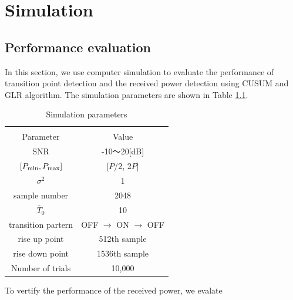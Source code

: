\chapter[Simulation]{Simulation}
\label{chapter:Result}



\section{Performance evaluation}
In this section, we use computer simulation to evaluate the performance of transition point detection and the received power detection using CUSUM and GLR algorithm. The simulation parameters are shown in Table \ref{parameter}.

\begin{table}[!htp]
\begin{center}
 \caption{\normalsize{Simulation parameters}}
 
\normalsize

  \begin{tabular}{c|c}
    & \\
    Parameter &Value \\ \hline
    SNR & -10〜20[dB] \\
    $[P_{{\rm min}},P_{{\rm max}}]$ & [$P$/2, 2$P$] \\
    $\sigma^2$ & 1 \\
    sample number & 2048 \\
    $\bar{T}_0$ & 10 \\
    transition partern & OFF $\rightarrow$ ON $\rightarrow$ OFF \\
    rise up point & 512th sample\\
    rise down point & 1536th sample\\
    Number of trials & 10,000 \\ \hline
  \end{tabular}
\label{parameter}
\end{center}
\end{table}

To vertify the performance of the received power, we evalate

